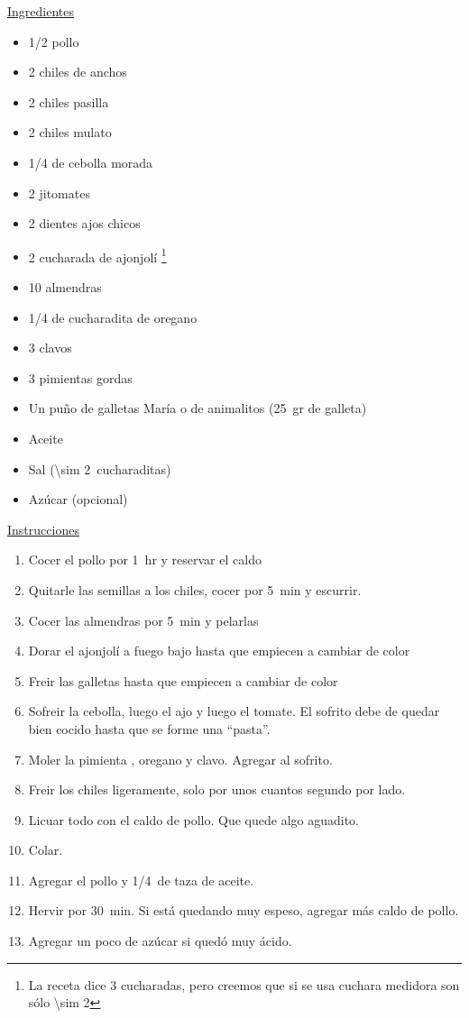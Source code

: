 \underline{Ingredientes}
\begin{itemize}
\item \num{1/2} pollo
\item 2 chiles de anchos
\item 2 chiles pasilla
\item 2 chiles mulato
\item \num{1/4} de cebolla morada
\item 2 jitomates
\item 2 dientes ajos chicos
\item 2 cucharada de ajonjolí \footnote{La receta dice 3 cucharadas, pero creemos que si se usa cuchara medidora son sólo \num{\sim 2}}
\item 10 almendras
\item \num{1/4} de cucharadita de oregano
\item 3 clavos
\item 3 pimientas gordas
\item Un puño de galletas María o de animalitos (\SI{25}{gr} de galleta)
\item Aceite
\item Sal (\SI{\sim 2}{cucharaditas})
\item Azúcar (opcional)
\end{itemize}

\underline{Instrucciones}
\begin{enumerate}
\item Cocer el pollo por \SI{1}{hr} y reservar el caldo
\item Quitarle las semillas a los chiles, cocer por \SI{5}{min} y escurrir.
\item Cocer las almendras por \SI{5}{min} y pelarlas
\item Dorar el ajonjolí a fuego bajo hasta que empiecen a cambiar de color
\item Freir las galletas hasta que empiecen a cambiar de color
\item Sofreir la cebolla, luego el ajo y luego el tomate. El sofrito debe de quedar bien cocido hasta que se forme una ``pasta''.
\item Moler la pimienta , oregano y clavo. Agregar al sofrito.
\item Freir los chiles ligeramente, solo por unos cuantos segundo por lado.
\item Licuar todo con el caldo de pollo. Que quede algo aguadito.
\item Colar.
\item Agregar el pollo y \SI{1/4}{de} taza de aceite.
\item Hervir por \SI{30}{min}. Si está quedando muy espeso, agregar más caldo de pollo.
\item Agregar un poco de azúcar si quedó muy ácido.
\end{enumerate}